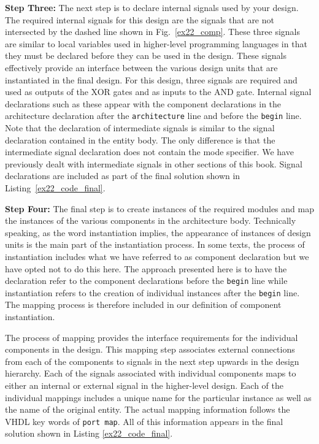 \noindent
\textbf{Step Three:} The next step is to declare internal signals used by your design. The required internal signals for this design are the signals that are not intersected by the dashed line shown in Fig.~\ref{ex22_comp}. These three signals are similar to local variables used in higher-level programming languages in that they must be declared before they can be used in the design. These signals effectively provide an interface between the various design units that are instantiated in the final design. For this design, three signals are required and used as outputs of the XOR gates and as inputs to the AND gate. Internal signal declarations such as these appear with the component declarations in the architecture declaration after the  \texttt{architecture} line and before the  \texttt{begin} line. Note that the declaration of intermediate signals is similar to the signal declaration contained in the entity body. The only difference is that the intermediate signal declaration does not contain the mode specifier. We have previously dealt with intermediate signals in other sections of this book. Signal declarations are included as part of the final solution shown in Listing~\ref{ex22_code_final}.

\noindent
\textbf{Step Four:} The final step is to create instances of the required modules and map the instances of the various components in the architecture body. Technically speaking, as the word instantiation implies, the appearance of instances of design units is the main part of the instantiation process. In some texts, the process of instantiation includes what we have referred to as component declaration but we have opted not to do this here. The approach presented here is to have the declaration refer to the component declarations before the \texttt{begin} line while instantiation refers to the creation of individual instances after the \texttt{begin} line. The mapping process is therefore included in our definition of component instantiation.

The process of mapping provides the interface requirements for the individual components in the design. This mapping step associates external connections from each of the components to signals in the next step upwards in the design hierarchy. Each of the signals associated with individual components maps to either an internal or external signal in the higher-level design. Each of the individual mappings includes a unique name for the particular instance as well as the name of the original entity. The actual mapping information follows the VHDL key words of \texttt{port map}. All of this information appears in the final solution shown in Listing \ref{ex22_code_final}.

